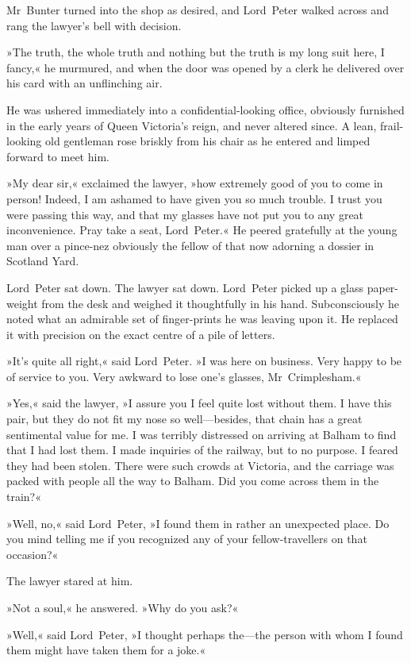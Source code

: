 Mr~Bunter turned into the shop as desired, and Lord~Peter walked across and rang the lawyer's bell with decision.

»The truth, the whole truth and nothing but the truth is my long suit here, I fancy,« he murmured, and when the door was opened by a clerk he delivered over his card with an unflinching air.

He was ushered immediately into a confidential-looking office, obviously furnished in the early years of Queen Victoria's reign, and never altered since. A lean, frail-looking old gentleman rose briskly from his chair as he entered and limped forward to meet him.

»My dear sir,« exclaimed the lawyer, »how extremely good of you to come in person! Indeed, I am ashamed to have given you so much trouble. I trust you were passing this way, and that my glasses have not put you to any great inconvenience. Pray take a seat, Lord~Peter.« He peered gratefully at the young man over a pince-nez obviously the fellow of that now adorning a dossier in Scotland Yard.

Lord~Peter sat down. The lawyer sat down. Lord~Peter picked up a glass paper-weight from the desk and weighed it thoughtfully in his hand. Subconsciously he noted what an admirable set of finger-prints he was leaving upon it. He replaced it with precision on the exact centre of a pile of letters.

»It's quite all right,« said Lord~Peter. »I was here on business. Very happy to be of service to you. Very awkward to lose one's glasses, Mr~Crimplesham.«

»Yes,« said the lawyer, »I assure you I feel quite lost without them. I have this pair, but they do not fit my nose so well—besides, that chain has a great sentimental value for me. I was terribly distressed on arriving at Balham to find that I had lost them. I made inquiries of the railway, but to no purpose. I feared they had been stolen. There were such crowds at Victoria, and the carriage was packed with people all the way to Balham. Did you come across them in the train?«

»Well, no,« said Lord~Peter, »I found them in rather an unexpected place. Do you mind telling me if you recognized any of your fellow-travellers on that occasion?«

The lawyer stared at him.

»Not a soul,« he answered. »Why do you ask?«

»Well,« said Lord~Peter, »I thought perhaps the—the person with whom I found them might have taken them for a joke.«

